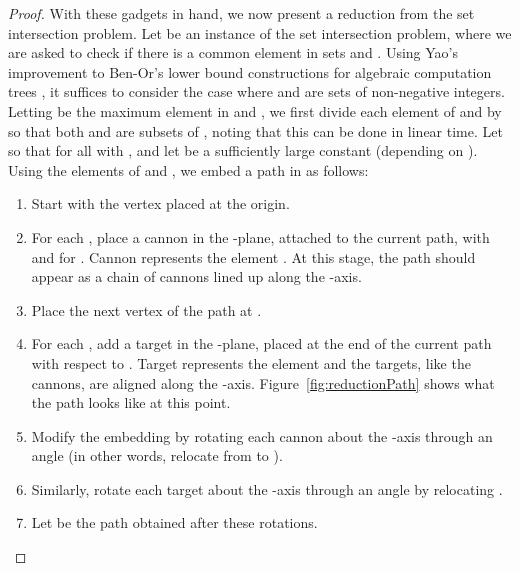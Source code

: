 \documentclass[11pt]{article}
\newcommand{\changedagain}[1]{{#1}}
\begin{document}
\begin{proof}
With these gadgets in hand, we now present a reduction from the set intersection problem.  Let  be an instance of the set intersection problem, where we are asked to check if there is a common element in sets  and . Using Yao's improvement to Ben-Or's lower bound constructions for algebraic computation trees \cite{Yao91}, it suffices to consider the case where  and  are sets of non-negative integers.  Letting  be the maximum element in  and , we first divide each element of  and  by  so that both  and  are subsets of , noting that this can be done in linear time.  Let  so that  for all  with , and let  be a sufficiently large constant (depending on ).  Using \changedagain{the elements} of  and , we embed a path  in  as follows:
\begin{enumerate}
\item Start with the vertex  placed \changedagain{at} the origin.
\item For each , place a cannon  in the -plane, attached to the current path, with  and  for .  Cannon  \changedagain{represents} the element .  At this stage, the path should appear as a chain of  cannons lined up along the -axis.
\item Place the next vertex  of the path \changedagain{at} .
\item For each , add a target  in the -plane, placed at the end of the current path with respect to .  Target  \changedagain{represents} the element  and the targets, like the cannons, \changedagain{are} aligned along the -axis. Figure~\ref{fig:reductionPath} shows what the path looks like at this point.
\item\label{enum:rotate1} Modify the embedding by rotating each cannon about the -axis through an angle  (in other words, relocate  from  to ).
\item Similarly, rotate each target  about the -axis through an angle  by relocating .
\item Let  be the path obtained after these rotations.
\end{enumerate}


\end{proof}
\end{document}
